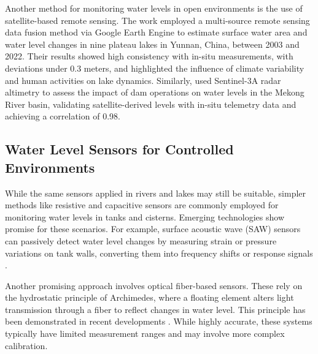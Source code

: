 \documentclass[conference]{IEEEtran}
\begin{document}
Another method for monitoring water levels in open environments is the use of satellite-based remote sensing. The work \cite{jiang_2024_monitoring} employed a multi-source remote sensing data fusion method via Google Earth Engine to estimate surface water area and water level changes in nine plateau lakes in Yunnan, China, between 2003 and 2022. Their results showed high consistency with in-situ measurements, with deviations under 0.3 meters, and highlighted the influence of climate variability and human activities on lake dynamics. Similarly, \cite{ali_2024_satellite} used Sentinel-3A radar altimetry to assess the impact of dam operations on water levels in the Mekong River basin, validating satellite-derived levels with in-situ telemetry data and achieving a correlation of 0.98.

\subsection{Water Level Sensors for Controlled Environments}


While the same sensors applied in rivers and lakes may still be suitable, simpler methods like resistive and capacitive sensors are commonly employed for monitoring water levels in tanks and cisterns. Emerging technologies show promise for these scenarios. For example, surface acoustic wave (SAW) sensors can passively detect water level changes by measuring strain or pressure variations on tank walls, converting them into frequency shifts or response signals \cite{ali_2020_saw, sreejith_2024_modeling}.
 
Another promising approach involves optical fiber-based sensors. These rely on the hydrostatic principle of Archimedes, where a floating element alters light transmission through a fiber to reflect changes in water level. This principle has been demonstrated in recent developments \cite{ramos_2025_high}. While highly accurate, these systems typically have limited measurement ranges and may involve more complex calibration.
\end{document}
